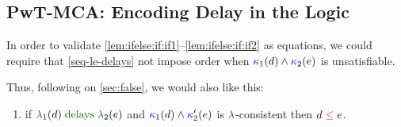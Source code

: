 \subsection{PwT-MCA: Encoding Delay in the Logic}
\label{sec:delay}

In order to validate
\eqref{lem:ifelse:if:if1}--\eqref{lem:ifelse:if:if2} as
equations, we could require that \ref{seq-le-delays} not impose order when
${\color{blue}\kappa}_1(d) \land {\color{blue}\kappa}_2(e)$ is unsatisfiable.

Thus, following on \textsection\ref{sec:false}, we would also like this:
\begin{enumerate}
\item[{\labeltext[\textsc{s}6b$'$]{(\textsc{s}6b$'$)}{seq-le-delays'}}] if
  $\labeling_1(\bEv) \rdelays \labeling_2(\aEv)$ and
  ${\color{blue}\kappa}_1(d) \land {\color{blue}\kappa}_2'(e)$ is
  $\labeling$-consistent then $\bEv\le\aEv$.
\end{enumerate}


